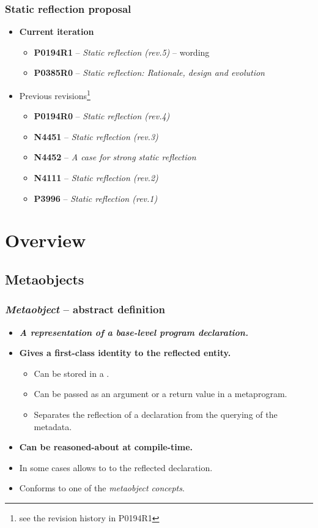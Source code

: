 \documentclass[compress,table,xcolor=table]{beamer}
\begin{document}
\begin{frame}
\frametitle{Static reflection proposal}
  \begin{itemize}
    \large
    \item \textbf{Current iteration}
    \begin{itemize}
      \item \textbf{P0194R1} -- {\em Static reflection (rev.5)} {\small -- wording}
      \item \textbf{P0385R0} -- {\em Static reflection: {\small Rationale, design and evolution}}
    \end{itemize}
    \normalsize
    \item Previous revisions\footnote{see the revision history in P0194R1}
    \begin{itemize}
      \small
      \item \textbf{P0194R0} -- {\em Static reflection (rev.4)}
      \item \textbf{N4451} -- {\em Static reflection (rev.3)}
      \item \textbf{N4452} -- {\em A case for strong static reflection}
      \item \textbf{N4111} -- {\em Static reflection (rev.2)}
      \item \textbf{P3996} -- {\em Static reflection (rev.1)}
    \end{itemize}
  \end{itemize}
\end{frame}

\section{Overview}

\subsection{Metaobjects}
\begin{frame}
\frametitle{{\em Metaobject} -- abstract definition}
  \large
  \begin{itemize}
    \item \textbf{{\em A representation of a base-level program declaration.}}
    \item {\Large \textbf{Gives a first-class identity to the reflected entity.}}
    \begin{itemize}
      \small
      \item Can be stored in a .
      \item Can be passed as an argument or a return value in a metaprogram.
      \item Separates the reflection of a declaration from
      the querying of the metadata.
    \end{itemize}
    \item \textbf{Can be reasoned-about at compile-time.}
    \item In some cases allows to  to the reflected declaration.
    \item Conforms to one of the {\em metaobject concepts}.
  \end{itemize}
\end{frame}
\end{document}
